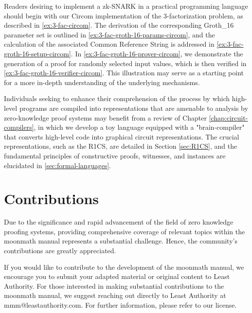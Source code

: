 Readers desiring to implement a zk-SNARK in a practical programming language should begin with our Circom implementation of the 3-factorization problem, as described in \ref{ex:3-fac-circom}. The derivation of the corresponding Groth\_16 parameter set is outlined in \ref{ex:3-fac-groth-16-params-circom}, and the calculation of the associated Common Reference String is addressed in \ref{ex:3-fac-groth-16-setup-circom}. In \ref{ex:3-fac-groth-16-prover-circom}, we demonstrate the generation of a proof for randomly selected input values, which is then verified in \ref{ex:3-fac-groth-16-verifier-circom}. This illustration may serve as a starting point for a more in-depth understanding of the underlying mechanisms.

Individuals seeking to enhance their comprehension of the process by which high-level programs are compiled into representations that are amenable to analysis by zero-knowledge proof systems may benefit from a review of Chapter \ref{chap:circuit-compilers}, in which we develop a toy language equipped with a "brain-compiler" that converts high-level code into graphical circuit representations. The crucial representations, such as the R1CS, are detailed in Section \ref{sec:R1CS}, and the fundamental principles of constructive proofs, witnesses, and instances are elucidated in \ref{sec:formal-languages}.



\section{Contributions}Due to the significance and rapid advancement of the field of zero knowledge proofing systems, providing comprehensive coverage of relevant topics within the moonmath manual represents a substantial challenge. Hence, the community's contributions are greatly appreciated.

If you would like to contribute to the development of the moonmath manual, we encourage you to submit your adapted material or original content to Least Authority. For those interested in making substantial contributions to the moonmath manual, we suggest reaching out directly to Least Authority at mmm@leastauthority.com. For further information, please refer to our license.


